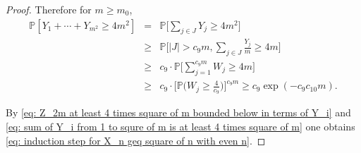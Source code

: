 \documentclass[12pt]{article}
\numberwithin{equation}{section}
\newcommand{\1}{\mathbf{1}}
\begin{document}
\begin{proof}

	Therefore for $m\geq m_0$,
	\begin{eqnarray}\label{eq: sum of Y_i from 1 to squre of m is at least 4 times square of m}
		\mathbb{P}[Y_1+\cdots+Y_{m^2}\geq 4m^2]&=& \mathbb{P}\bigg[\sum_{j\in J}{Y_j}\geq 4m^2\bigg]\nonumber\\
		&\geq&\mathbb{P}\bigg[|J|>c_9m,\sum_{j\in J}{\frac{Y_j}{m}}\geq 4m\bigg]\nonumber\\
		&\geq& c_9\cdot \mathbb{P}\bigg[\sum_{j=1}^{c_9m}W_j\geq 4m\bigg]\nonumber\\
		&\geq &c_9\cdot \big[\mathbb{P}\big(W_j\geq \frac{4}{c_9}\big)\Big]^{c_9m}\geq  c_9\exp(-c_9c_{10}m).
	\end{eqnarray}


By \eqref{eq: Z_2m at least 4 times square of m bounded below in terms of Y_i} and \eqref{eq: sum of Y_i from 1 to squre of m is at least 4 times square of m} one obtains \eqref{eq: induction step for X_n geq square of n with even n}. 
\end{proof}	
\end{document}
